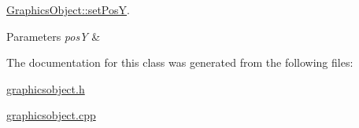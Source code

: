 \hyperlink{class_graphics_object_ab450d85cfafd5eb80c2ce75784e13088}{Graphics\+Object\+::set\+PosY}. 


\begin{DoxyParams}{Parameters}
{\em posY} & \\
\hline
\end{DoxyParams}


The documentation for this class was generated from the following files\+:\begin{DoxyCompactItemize}
\item 
\hyperlink{graphicsobject_8h}{graphicsobject.\+h}\item 
\hyperlink{graphicsobject_8cpp}{graphicsobject.\+cpp}\end{DoxyCompactItemize}
